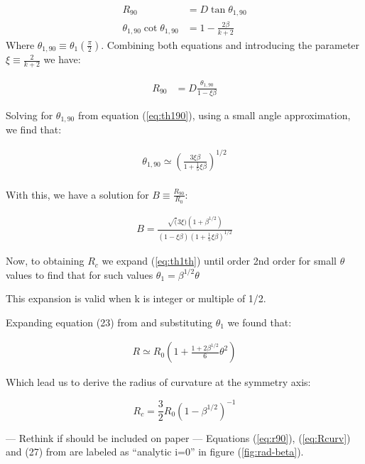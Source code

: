 \begin{align}
R_{90} &= D\tan\theta_{1,90} \\
\theta_{1,90}\cot\theta_{1,90} &= 1-\frac{2\beta}{k+2} \label{eq:th190}
\end{align}
Where $\theta_{1,90}\equiv \theta_1(\frac{\pi}{2})$. Combining both equations and  introducing the parameter 
$\xi\equiv \frac{2}{k+2}$ we have:

\begin{align}
R_{90} &= D\frac{\theta_{1,90}}{1-\xi\beta} 
\end{align}


Solving for $\theta_{1,90}$ from equation (\ref{eq:th190}), using a small angle  approximation, we find that:

\begin{align}
\theta_{1,90} \simeq \left(\frac{3\xi\beta}{1+\frac{1}{5}\xi\beta}\right)^{1/2} \\
\label{eq:th190sol}
\end{align}

With this, we have a solution for $B \equiv \frac{R_{90}}{R_0}$:

\begin{align}
B = \frac{\sqrt(3\xi)\left(1+\beta^{1/2}\right)}{(1-\xi\beta)\left(1+\frac{1}{5}\xi\beta\right)^{1/2}}
\label{eq:B}
\end{align}

Now, to obtaining $R_c$ we expand  (\ref{eq:th1th}) until order 2nd order for small $\theta$ values to find that for such values
$\theta_1 = \beta^{1/2}\theta$

This expansion is valid when k is integer or multiple of 1/2.

Expanding equation (23) from \citep{Canto:1996} and substituting $\theta_1$ we found that:

\begin{align}
R \simeq R_0 \left(1+\frac{1+2\beta^{1/2}}{6}\theta^2\right)
\label{eq:R_approx}
\end{align}

Which lead us to derive the radius of curvature at the symmetry axis:

\begin{equation}
R_c = \frac{3}{2}R_0\left(1-\beta^{1/2}\right)^{-1}
\label{eq:Rcurv}
\end{equation}

--- Rethink if should be included on paper ---
Equations (\ref{eq:r90}),  (\ref{eq:Rcurv}) and (27) from \citep{Canto:1996} are labeled as ``analytic i=0'' in figure (\ref{fig:rad-beta}).

